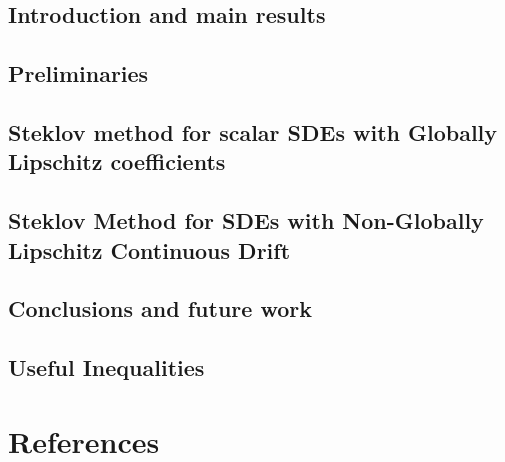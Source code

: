 
 
% 

	\frontmatter
	\pagestyle{empty} 
	
	
	
	\cleardoublepage
	\pagestyle{fancy}
	\tableofcontents
	\listoffigures
	\listoftables
	
	\cleardoublepage
	\mainmatter
	\chapter{Introduction and main results}
		\label{ch:Chapter1}
		
	\chapter{Preliminaries}
		\label{ch:Chapter2}
		
	\chapter{Steklov method for scalar SDEs with Globally Lipschitz coefficients}
		\label{ch:Chapter3}
		
	\chapter{Steklov Method for SDEs with Non-Globally Lipschitz Continuous Drift}
		\label{ch:Chapter4}
		
	\chapter{Conclusions and future work}
		\label{ch:Chapter5}
			
	\begin{appendices}
		\chapter{Useful Inequalities}
			
	\end{appendices}
	\part*{References}
	
	
